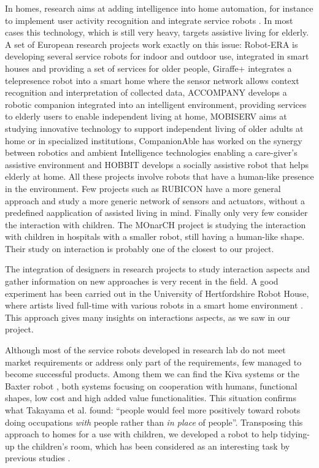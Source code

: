 \documentclass{sig-alternate}
\begin{document}
In homes, research aims at adding intelligence into home automation, for
instance to implement user activity recognition \cite{duque2013knowledge} and
integrate service robots \cite{Cavallo2013}.  In most cases this technology,
which is still very heavy, targets assistive living for elderly.  A set of
European research projects work exactly on this issue:
Robot-ERA\cite{Aquilano2012} is developing several service robots for indoor and
outdoor use, integrated in smart houses and providing a set of services for
older people, Giraffe+\cite{Coradeschi2013} integrates a telepresence robot into
a smart home where the sensor network allows context recognition and
interpretation of collected data, ACCOMPANY\cite{Accompany2013} develops a
robotic companion integrated into an intelligent environment, providing services
to elderly users to enable independent living at home, MOBISERV\cite{Nani2010}
aims at studying innovative technology to support independent living of older
adults at home or in specialized institutions, CompanionAble\cite{Gross2011} has
worked on the synergy between robotics and ambient Intelligence technologies
enabling a care-giver's assistive environment and
HOBBIT\cite{fischinger2013hobbit} develops a socially assistive robot that helps
elderly at home.  All these projects involve robots that have a human-like
presence in the environment.  Few projects such as RUBICON\cite{Bacciu2013} have
a more general approach and study a more generic network of sensors and
actuators, without a predefined aapplication of assisted living in mind.
Finally only very few consider the interaction with children.  The MOnarCH
project \cite{Sequeira2013} is studying the interaction with children in
hospitals with a smaller robot, still having a human-like shape.  Their study on
interaction is probably one of the closest to our project. 

The integration of designers in research projects to study interaction aspects
and gather information on new approaches is very recent in the field.  A good
experiment has been carried out in the University of Hertfordshire Robot House,
where artists lived full-time with various robots in a smart home environment
\cite{LEHMANN2013}.  This approach gives many insights on interactions aspects,
as we saw in our project.

Although most of the service robots developed in research lab do not meet market
requirements or address only part of the requirements, few managed to become
successful products.  Among them we can find the Kiva systems \cite{Wurman2008}
or the Baxter robot \cite{Fitzgerald2013}, both systems focusing on cooperation
with humans, functional shapes, low cost and high added value functionalities.
This situation confirms what Takayama et al. \cite{Takayama2008} found: ``people
would feel more positively toward robots doing occupations \textit{with} people
rather than \textit{in place} of people''.  Transposing this approach to homes
for a use with children, we developed a robot to help tidying-up the children's
room, which has been considered as an interesting task by previous studies
\cite{Pantofaru2012,Bell2005}.
\end{document}
